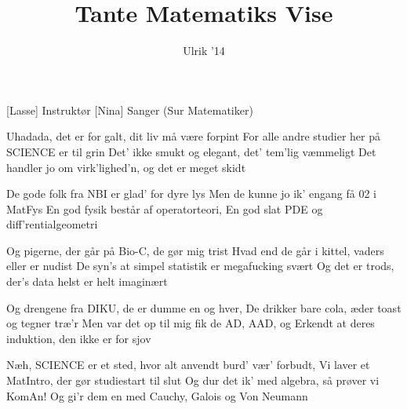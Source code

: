 \documentclass[a4paper,11pt]{article}
\title{Tante Matematiks Vise}
\author{Ulrik '14}
\begin{document}
\maketitle

\begin{roles}
[Lasse] Instruktør
[Nina] Sanger (Sur Matematiker)
\end{roles}

\begin{song}
 Uhadada, det er for galt, dit liv må være forpint
For alle andre studier her på SCIENCE er til grin
Det' ikke smukt og elegant, det' tem'lig væmmeligt
Det handler jo om virk'lighed'n, og det er meget skidt

 De gode folk fra NBI er glad' for dyre lys
Men de kunne jo ik' engang få 02 i MatFys
En god fysik består af operatorteori,
En god slat PDE og diff'rentialgeometri

 Og pigerne, der går på Bio-C, de gør mig trist
Hvad end de går i kittel, vaders eller er nudist
De syn's at simpel statistik er megafucking svært
Og det er trods, der's data helst er helt imaginært

 Og drengene fra DIKU, de er dumme en og hver,
De drikker bare cola, æder toast og tegner træ'r
Men var det op til mig fik de AD, AAD, og
Erkendt at deres induktion, den ikke er for sjov

 Næh, SCIENCE er et sted, hvor alt anvendt burd' vær' forbudt,
Vi laver et MatIntro, der gør studiestart til slut
Og dur det ik' med algebra, så prøver vi KomAn!
Og gi'r dem en med Cauchy, Galois og Von Neumann
\end{song}
\end{document}
